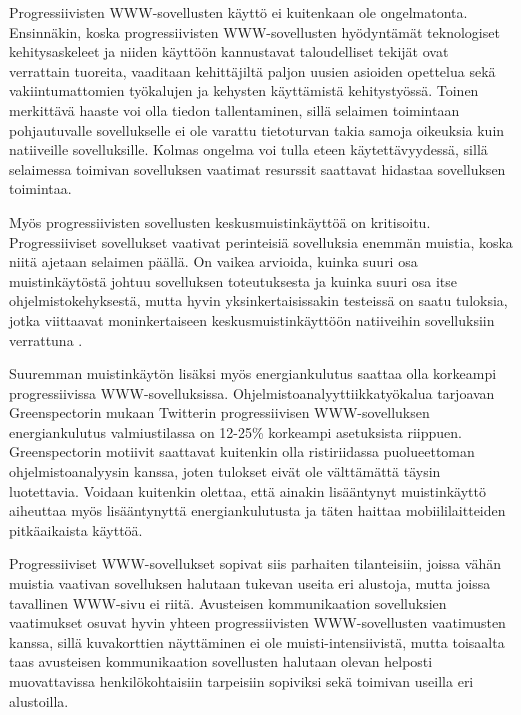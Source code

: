 \documentclass[utf8]{gradu3}
\begin{document}
Progressiivisten WWW-sovellusten käyttö ei kuitenkaan ole ongelmatonta. Ensinnäkin, koska progressiivisten WWW-sovellusten hyödyntämät teknologiset kehitysaskeleet ja niiden käyttöön kannustavat taloudelliset tekijät ovat verrattain tuoreita, vaaditaan kehittäjiltä paljon uusien asioiden opettelua sekä vakiintumattomien työkalujen ja kehysten käyttämistä kehitystyössä. Toinen merkittävä haaste voi olla tiedon tallentaminen, sillä selaimen toimintaan pohjautuvalle sovellukselle ei ole varattu tietoturvan takia samoja oikeuksia kuin natiiveille sovelluksille. Kolmas ongelma voi tulla eteen käytettävyydessä, sillä selaimessa toimivan sovelluksen vaatimat resurssit saattavat hidastaa sovelluksen toimintaa. \parencite[]{pwa-design-challenges}

Myös progressiivisten sovellusten keskusmuistinkäyttöä on kritisoitu. Progressiiviset sovellukset vaativat perinteisiä sovelluksia enemmän muistia, koska niitä ajetaan selaimen päällä. On vaikea arvioida, kuinka suuri osa muistinkäytöstä johtuu sovelluksen toteutuksesta ja kuinka suuri osa itse ohjelmistokehyksestä, mutta hyvin yksinkertaisissakin testeissä on saatu tuloksia, jotka viittaavat moninkertaiseen keskusmuistinkäyttöön natiiveihin sovelluksiin verrattuna \parencite[]{electron-memory-usage}.

Suuremman muistinkäytön lisäksi myös energiankulutus saattaa olla korkeampi progressiivissa WWW-sovelluksissa. Ohjelmistoanalyyttiikkatyökalua tarjoavan Greenspectorin mukaan \parencite[]{pwa-power-usage} Twitterin progressiivisen WWW-sovelluksen energiankulutus valmiustilassa on 12-25\% korkeampi asetuksista riippuen. Greenspectorin motiivit saattavat kuitenkin olla ristiriidassa puolueettoman ohjelmistoanalyysin kanssa, joten tulokset eivät ole välttämättä täysin luotettavia. Voidaan kuitenkin olettaa, että ainakin lisääntynyt muistinkäyttö aiheuttaa myös lisääntynyttä energiankulutusta ja täten haittaa mobiililaitteiden pitkäaikaista käyttöä.

Progressiiviset WWW-sovellukset sopivat siis parhaiten tilanteisiin, joissa vähän muistia vaativan sovelluksen halutaan tukevan useita eri alustoja, mutta joissa tavallinen WWW-sivu ei riitä. Avusteisen kommunikaation sovelluksien vaatimukset osuvat hyvin yhteen progressiivisten WWW-sovellusten vaatimusten kanssa, sillä kuvakorttien näyttäminen ei ole muisti-intensiivistä, mutta toisaalta taas avusteisen kommunikaation sovellusten halutaan olevan helposti muovattavissa henkilökohtaisiin tarpeisiin sopiviksi sekä toimivan useilla eri alustoilla.
\end{document}
